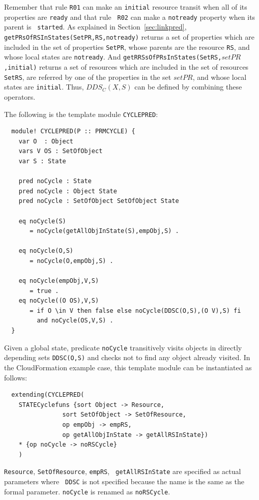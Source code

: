 \documentclass[12pt]{report}
\newcommand{\stt}[1]{{\small{\tt {#1}}}}
\begin{document}
Remember that rule {\tt R01} can make an {\tt initial} resource
transit when all of its properties are {\tt ready} and that rule {\tt
  R02} can make a {\tt notready} property when its parent is {\tt
  started}. As explained in Section~\ref{sec:linkpred},
\stt{getPRsOfRSInStates(SetPR,RS,notready)} returns a set of
properties which are included in the set of properties {\tt SetPR},
whose parents are the resource {\tt RS}, and whose local states are
{\tt notready}. And \stt{getRRSsOfPRsInStates(SetRS,$setPR$,initial)}
returns a set of resources which are included in the set of resources
{\tt SetRS}, are referred by one of the properties in the set $setPR$,
and whose local states are {\tt initial}. Thus, $DDS_C(X,S)$ can be
defined by combining these operators.

The following is the template module {\tt CYCLEPRED}:
\begin{verbatim}
  module! CYCLEPRED(P :: PRMCYCLE) {
    var O  : Object
    vars V OS : SetOfObject
    var S : State
  
    pred noCycle : State
    pred noCycle : Object State
    pred noCycle : SetOfObject SetOfObject State
  
    eq noCycle(S)
       = noCycle(getAllObjInState(S),empObj,S) .
  
    eq noCycle(O,S)
       = noCycle(O,empObj,S) .
  
    eq noCycle(empObj,V,S)
       = true .
    eq noCycle((O OS),V,S)
       = if O \in V then false else noCycle(DDSC(O,S),(O V),S) fi
         and noCycle(OS,V,S) .
  }
\end{verbatim}
Given a global state, predicate {\tt noCycle} transitively visits
objects in directly depending sets \stt{DDSC(O,S)} and checks not to
find any object already visited. In the CloudFormation example case,
this template module can be instantiated as follows:
\begin{verbatim}
  extending(CYCLEPRED(
  	STATECyclefuns {sort Object -> Resource,
  	       		sort SetOfObject -> SetOfResource,
  	       		op empObj -> empRS,
  	       		op getAllObjInState -> getAllRSInState})
  	* {op noCycle -> noRSCycle}
  	)
\end{verbatim}
 {\tt Resource}, {\tt SetOfResource}, {\tt empRS}, {\tt
   getAllRSInState} are specified as actual parameters where {\tt
   DDSC} is not specified because the name is the same as the formal
 parameter.  {\tt noCycle} is renamed as {\tt noRSCycle}.
\end{document}
